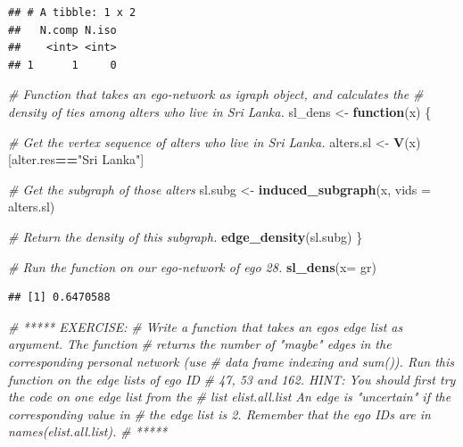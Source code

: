 \documentclass[
]{book}
\newenvironment{Shaded}{\begin{snugshade}}{\end{snugshade}}
\newcommand{\AttributeTok}[1]{\textcolor[rgb]{0.13,0.29,0.53}{#1}}
\newcommand{\CommentTok}[1]{\textcolor[rgb]{0.56,0.35,0.01}{\textit{#1}}}
\newcommand{\ControlFlowTok}[1]{\textcolor[rgb]{0.13,0.29,0.53}{\textbf{#1}}}
\newcommand{\FunctionTok}[1]{\textcolor[rgb]{0.13,0.29,0.53}{\textbf{#1}}}
\newcommand{\NormalTok}[1]{#1}
\newcommand{\OtherTok}[1]{\textcolor[rgb]{0.56,0.35,0.01}{#1}}
\newcommand{\SpecialCharTok}[1]{\textcolor[rgb]{0.81,0.36,0.00}{\textbf{#1}}}
\newcommand{\StringTok}[1]{\textcolor[rgb]{0.31,0.60,0.02}{#1}}
\begin{document}
\begin{verbatim}
## # A tibble: 1 x 2
##   N.comp N.iso
##    <int> <int>
## 1      1     0
\end{verbatim}

\begin{Shaded}
\begin{Highlighting}[]
\CommentTok{\# Function that takes an ego{-}network as igraph object, and calculates the}
\CommentTok{\# density of ties among alters who live in Sri Lanka.}
\NormalTok{sl\_dens }\OtherTok{\textless{}{-}} \ControlFlowTok{function}\NormalTok{(x) \{}
  
  \CommentTok{\# Get the vertex sequence of alters who live in Sri Lanka.}
\NormalTok{  alters.sl }\OtherTok{\textless{}{-}} \FunctionTok{V}\NormalTok{(x)[alter.res}\SpecialCharTok{==}\StringTok{"Sri Lanka"}\NormalTok{]}
  
  \CommentTok{\# Get the subgraph of those alters}
\NormalTok{  sl.subg }\OtherTok{\textless{}{-}} \FunctionTok{induced\_subgraph}\NormalTok{(x, }\AttributeTok{vids =}\NormalTok{ alters.sl) }
  
  \CommentTok{\# Return the density of this subgraph.}
  \FunctionTok{edge\_density}\NormalTok{(sl.subg)}
\NormalTok{\}}

\CommentTok{\# Run the function on our ego{-}network of ego 28.}
\FunctionTok{sl\_dens}\NormalTok{(}\AttributeTok{x=}\NormalTok{ gr)}
\end{Highlighting}
\end{Shaded}

\begin{verbatim}
## [1] 0.6470588
\end{verbatim}

\begin{Shaded}
\begin{Highlighting}[]
\CommentTok{\# ***** EXERCISE: }
\CommentTok{\# Write a function that takes an ego\textquotesingle{}s edge list as argument. The function}
\CommentTok{\# returns the number of "maybe" edges in the corresponding personal network (use}
\CommentTok{\# data frame indexing and sum()). Run this function on the edge lists of ego ID}
\CommentTok{\# 47, 53 and 162. HINT: You should first try the code on one edge list from the}
\CommentTok{\# list elist.all.list An edge is "uncertain" if the corresponding value in}
\CommentTok{\# the edge list is 2. Remember that the ego IDs are in names(elist.all.list).}
\CommentTok{\# *****}
\end{Highlighting}
\end{Shaded}
\end{document}

